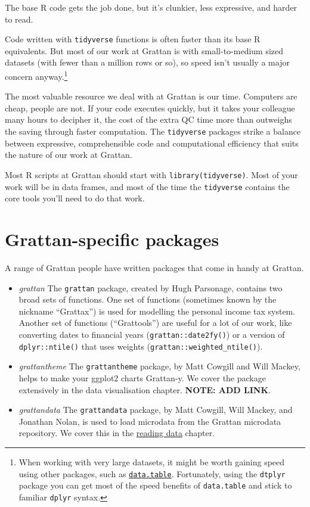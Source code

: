 \documentclass[]{book}
\let\rmarkdownfootnote\footnote%
\def\footnote{\protect\rmarkdownfootnote}
\begin{document}
The base R code gets the job done, but it's clunkier, less expressive, and harder to read.

Code written with \texttt{tidyverse} functions is often faster than its base R equivalents. But most of our work at Grattan is with small-to-medium sized datasets (with fewer than a million rows or so), so speed isn't usually a major concern anyway.\footnote{When working with very large datasets, it might be worth gaining speed using other packages, such as \href{https://cran.r-project.org/web/packages/data.table/vignettes/datatable-intro.html}{\texttt{data.table}}. Fortunately, using the \texttt{dtplyr} package you can get most of the speed benefits of \texttt{data.table} and stick to familiar \texttt{dplyr} syntax.}

The most valuable resource we deal with at Grattan is our time. Computers are cheap, people are not. If your code executes quickly, but it takes your colleague many hours to decipher it, the cost of the extra QC time more than outweighs the saving through faster computation. The \texttt{tidyverse} packages strike a balance between expressive, comprehensible code and computational efficiency that suits the nature of our work at Grattan.

Most R scripts at Grattan should start with \texttt{library(tidyverse)}. Most of your work will be in data frames, and most of the time the \texttt{tidyverse} contains the core tools you'll need to do that work.

\hypertarget{grattan-specific-packages}{%
\section{Grattan-specific packages}\label{grattan-specific-packages}}

A range of Grattan people have written packages that come in handy at Grattan.

\begin{itemize}
\item
  \emph{grattan} The \texttt{grattan} package, created by Hugh Parsonage, contains two broad sets of functions. One set of functions (sometimes known by the nickname ``Grattax'') is used for modelling the personal income tax system. Another set of functions (``Grattools'') are useful for a lot of our work, like converting dates to financial years (\texttt{grattan::date2fy()}) or a version of \texttt{dplyr::ntile()} that uses weights (\texttt{grattan::weighted\_ntile()}).
\item
  \emph{grattantheme} The \texttt{grattantheme} package, by Matt Cowgill and Will Mackey, helps to make your ggplot2 charts Grattan-y. We cover the package extensively in the data visualisation chapter. \textbf{NOTE: ADD LINK}.
\item
  \emph{grattandata} The \texttt{grattandata} package, by Matt Cowgill, Will Mackey, and Jonathan Nolan, is used to load microdata from the Grattan microdata repository. We cover this in the \protect\hyperlink{reading-data}{reading data} chapter.
\end{itemize}
\end{document}
